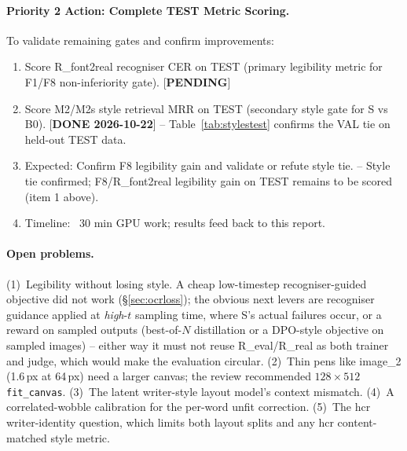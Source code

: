\documentclass[10.5pt,a4paper]{article}
\begin{document}
\paragraph{Priority 2 Action: Complete TEST Metric Scoring.}
To validate remaining gates and confirm improvements:
\begin{enumerate}
\item Score R\_font2real recogniser CER on TEST (primary legibility metric for F1/F8 non-inferiority gate). [\textbf{PENDING}]
\item Score M2/M2s style retrieval MRR on TEST (secondary style gate for S vs B0). [\textbf{DONE 2026-10-22}] --
  Table~\ref{tab:stylestest} confirms the VAL tie on held-out TEST data.
\item Expected: Confirm F8 legibility gain and validate or refute style tie. -- Style tie confirmed; F8/R\_font2real legibility
  gain on TEST remains to be scored (item 1 above).
\item Timeline: ~30 min GPU work; results feed back to this report.
\end{enumerate}

\paragraph{Open problems.} (1)~Legibility without losing style. A cheap low-timestep recogniser-guided objective did not
work (\S\ref{sec:ocrloss}); the obvious next levers are recogniser guidance applied at \emph{high}-$t$ sampling time, where
S's actual failures occur, or a reward on sampled outputs (best-of-$N$ distillation or a DPO-style objective on sampled
images) -- either way it must not reuse R\_eval/R\_real as both trainer and judge, which would make the evaluation
circular. (2)~Thin pens like image\_2 (1.6\,px at 64\,px) need a larger canvas; the review recommended $128\times512$
\texttt{fit\_canvas}. (3)~The latent writer-style layout model's context mismatch. (4)~A correlated-wobble calibration for
the per-word unfit correction. (5)~The hcr writer-identity question, which limits both layout splits and any hcr
content-matched style metric.

\end{document}
